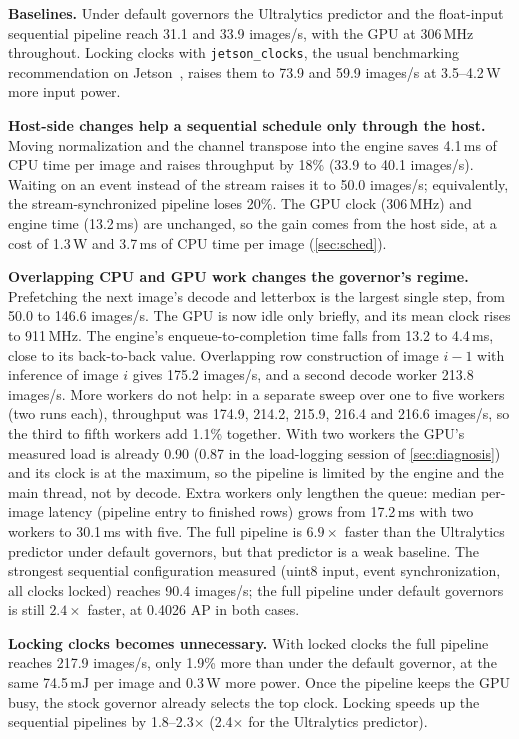 \textbf{Baselines.}
Under default governors the Ultralytics predictor and the float-input
sequential pipeline reach 31.1 and 33.9 images/s, with the GPU at
306\,MHz throughout. Locking clocks with \texttt{jetson\_clocks}, the
usual benchmarking recommendation on Jetson~\cite{nvidia2024jetsonperf},
raises them to 73.9 and 59.9 images/s at 3.5--4.2\,W more input power.

\textbf{Host-side changes help a sequential schedule only through the host.}
Moving normalization and the channel transpose into the engine saves
4.1\,ms of CPU time per image and raises throughput by 18\% (33.9 to
40.1 images/s). Waiting on an event instead of the stream raises it to
50.0 images/s; equivalently, the stream-synchronized pipeline loses
20\%. The GPU clock (306\,MHz) and engine time (13.2\,ms) are
unchanged, so the gain comes from the host side, at a cost of 1.3\,W and
3.7\,ms of CPU time per image (\cref{sec:sched}).

\textbf{Overlapping CPU and GPU work changes the governor's regime.}
Prefetching the next image's decode and letterbox is the largest
single step, from 50.0 to 146.6 images/s. The GPU is now idle only
briefly, and its mean clock rises to 911\,MHz. The engine's enqueue-to-completion time falls from 13.2 to
4.4\,ms, close to its back-to-back value. Overlapping row construction
of image $i{-}1$ with inference of image $i$ gives 175.2 images/s, and a
second decode worker 213.8 images/s. More workers do not help: in a
separate sweep over one to five workers (two runs each), throughput was 174.9, 214.2, 215.9, 216.4 and
216.6 images/s, so the third to fifth workers add 1.1\% together. With
two workers the GPU's measured load is already 0.90 (0.87 in the
load-logging session of \cref{sec:diagnosis}) and
its clock is at the maximum, so the pipeline is limited by the engine
and the main thread, not by decode. Extra workers only lengthen the
queue: median per-image latency (pipeline entry to finished rows) grows
from 17.2\,ms with two workers to
30.1\,ms with five. The full pipeline is $6.9\times$ faster than the
Ultralytics predictor under default governors, but that predictor is a
weak baseline. The strongest sequential configuration
measured (uint8 input, event synchronization, all clocks locked)
reaches 90.4 images/s; the full pipeline under default governors is
still $2.4\times$ faster, at 0.4026 AP in both cases.

\textbf{Locking clocks becomes unnecessary.}
With locked clocks the full pipeline reaches 217.9 images/s, only 1.9\%
more than under the default governor, at the same 74.5\,mJ per image and
0.3\,W more power. Once the pipeline keeps the GPU busy, the stock
governor already selects the top clock. Locking speeds up the sequential
pipelines by 1.8--2.3$\times$ (2.4$\times$ for the Ultralytics
predictor).

